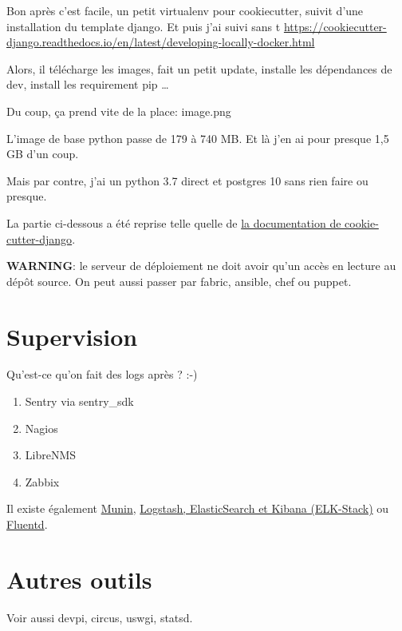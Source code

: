 \documentclass[11pt]{amsbook}
\newcommand{\admonition}[2]{\textbf{#1}: {#2}}
\begin{document}
Bon après c’est facile, un petit virtualenv pour cookiecutter, suivit d’une installation du template django.
Et puis j’ai suivi sans t \href{https://cookiecutter-django.readthedocs.io/en/latest/developing-locally-docker.html}{https://cookiecutter-django.readthedocs.io/en/latest/developing-locally-docker.html}


Alors, il télécharge les images, fait un petit update, installe les dépendances de dev, install les requirement pip …​


Du coup, ça prend vite de la place:
image.png


L’image de base python passe de 179 à 740 MB. Et là j’en ai pour presque 1,5 GB d’un coup.


Mais par contre, j’ai un python 3.7 direct et postgres 10 sans rien faire ou presque.


La partie ci-dessous a été reprise telle quelle de \href{https://cookiecutter-django.readthedocs.io/en/latest/deployment-with-docker.html}{la documentation de cookie-cutter-django}.


\admonition{WARNING}{le serveur de déploiement ne doit avoir qu’un accès en lecture au dépôt source.}
On peut aussi passer par fabric, ansible, chef ou puppet.


\hypertarget{x-supervision}{\chapter{Supervision}}
Qu’est-ce qu’on fait des logs après ? :-)


\begin{enumerate}

\item{Sentry via sentry\_sdk}

\item{Nagios}

\item{LibreNMS}

\item{Zabbix}

\end{enumerate}


Il existe également \href{https://munin-monitoring.org}{Munin}, \href{https://www.elastic.co}{Logstash, ElasticSearch et Kibana (ELK-Stack)} ou \href{https://www.fluentd.org}{Fluentd}.


\hypertarget{x-autres-outils}{\chapter{Autres outils}}
Voir aussi devpi, circus, uswgi, statsd.
\end{document}

